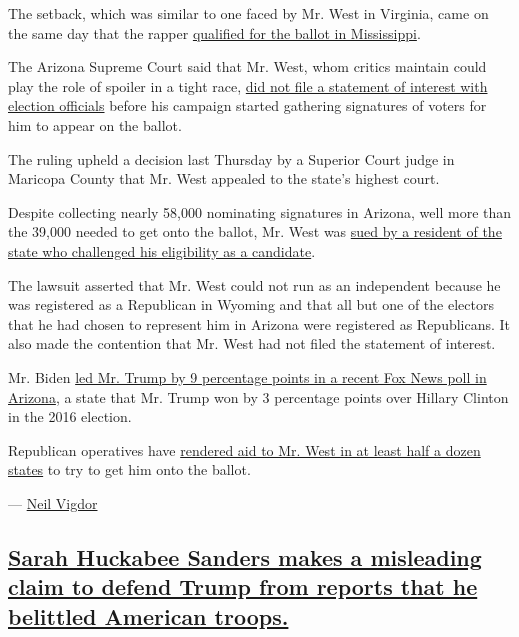 The setback, which was similar to one faced by Mr. West in Virginia,
came on the same day that the rapper
\href{https://www.sos.ms.gov/content/documents/elections/2020\%20Candidate\%20Qualifying\%20List.pdf}{qualified
for the ballot in Mississippi}.

The Arizona Supreme Court said that Mr. West, whom critics maintain
could play the role of spoiler in a tight race,
\href{https://arizonaslaw.blogspot.com/2020/09/breaking-kanye-loses-arizona-supreme.html}{did
not file a statement of interest with election officials} before his
campaign started gathering signatures of voters for him to appear on the
ballot.

The ruling upheld a decision last Thursday by a Superior Court judge in
Maricopa County that Mr. West appealed to the state's highest court.

Despite collecting nearly 58,000 nominating signatures in Arizona, well
more than the 39,000 needed to get onto the ballot, Mr. West was
\href{https://www.fox6now.com/news/lawsuit-seeks-to-ban-kanye-west-from-appearing-on-arizona-ballot-for-president}{sued
by a resident of the state who challenged his eligibility as a
candidate}.

The lawsuit asserted that Mr. West could not run as an independent
because he was registered as a Republican in Wyoming and that all but
one of the electors that he had chosen to represent him in Arizona were
registered as Republicans. It also made the contention that Mr. West had
not filed the statement of interest.

Mr. Biden
\href{https://www.nytimes3xbfgragh.onion/2020/09/03/us/politics/biden-trump-polling.html}{led
Mr. Trump by 9 percentage points in a recent Fox News poll in Arizona},
a state that Mr. Trump won by 3 percentage points over Hillary Clinton
in the 2016 election.

Republican operatives have
\href{https://www.nytimes3xbfgragh.onion/2020/08/04/us/politics/kanye-west-president-republicans.html}{rendered
aid to Mr. West in at least half a dozen states} to try to get him onto
the ballot.

--- \href{https://www.nytimes3xbfgragh.onion/by/neil-vigdor}{Neil
Vigdor}

\hypertarget{sarah-huckabee-sanders-makes-a-misleading-claim-to-defend-trump-from-reports-that-he-belittled-american-troops}{%
\subsection{\texorpdfstring{\protect\hyperlink{sarah-huckabee-sanders-makes-a-misleading-claim-to-defend-trump-from-reports-that-he-belittled-american-troops}{Sarah
Huckabee Sanders makes a misleading claim to defend Trump from reports
that he belittled American
troops.}}{Sarah Huckabee Sanders makes a misleading claim to defend Trump from reports that he belittled American troops.}}\label{sarah-huckabee-sanders-makes-a-misleading-claim-to-defend-trump-from-reports-that-he-belittled-american-troops}}

